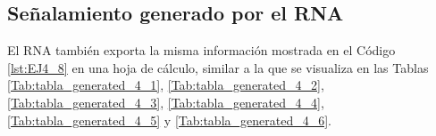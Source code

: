 \subsection{Señalamiento generado por el RNA}

    El RNA también exporta la misma información mostrada en el Código \ref{lst:EJ4_8} en una hoja de cálculo, similar a la que se visualiza en las Tablas \ref{Tab:tabla_generated_4_1}, \ref{Tab:tabla_generated_4_2}, \ref{Tab:tabla_generated_4_3}, \ref{Tab:tabla_generated_4_4}, \ref{Tab:tabla_generated_4_5} y \ref{Tab:tabla_generated_4_6}.

    \begin{table}[H]
        {
        \caption{Tabla de enclavamiento del ejemplo 4 generada por el RNA (Rutas 1 a 15).}
        \label{Tab:tabla_generated_4_1}
        \centering
        }
\end{table}
